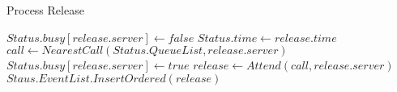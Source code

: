 \begin{algorithm}
  \hline \vspace{3pt}
  \caption{Process Release}\label{proc_rel}
  \vspace{3pt} \hline
  \begin{algorithmic}[0]
    \State $Status.busy[release.server] \gets false$
    \State $Status.time \gets release.time$
    \State $call \gets NearestCall(Status.QueueList,release.server)$
    \State $Status.busy[release.server] \gets true$
    \State $release \gets Attend(call,release.server)$
    \State $Staus.EventList.InsertOrdered(release)$
    \EndIf
    \EndProcedure
    \hline
  \end{algorithmic}
\end{algorithm}
